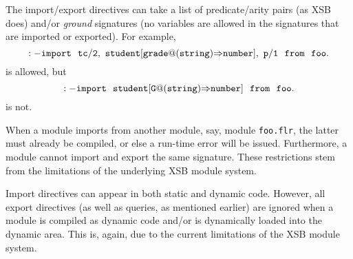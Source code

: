 \documentclass[11pt]{report}
\begin{document}
The import/export directives can take a list of predicate/arity pairs (as
XSB does) and/or \emph{ground} \fl signatures (no variables are allowed in
the signatures that are imported or exported). For example,
\[
\tt
:- import ~~tc/2,~
student[grade@(string){{\Rightarrow}}number],~ p/1~~from~~foo.
\]
is allowed, but 
\[
\tt
:- import ~~student[G@(string){{\Rightarrow}}number]~~from~~foo.
\]
is not.

When a \FLORA module imports from another module, say, module {\tt foo.flr}, 
the latter must already be compiled, or else a run-time error will be
issued. Furthermore, a \FLORA module cannot import and export the same
signature. These restrictions stem from the limitations of the underlying
XSB module system.

Import directives can appear in both static and dynamic code. However, all
export directives (as well as queries, as mentioned earlier) are ignored
when a \FLORA module is compiled as dynamic code and/or is dynamically loaded
into the dynamic area. This is, again, due to the current limitations of
the XSB module system.
\end{document}
